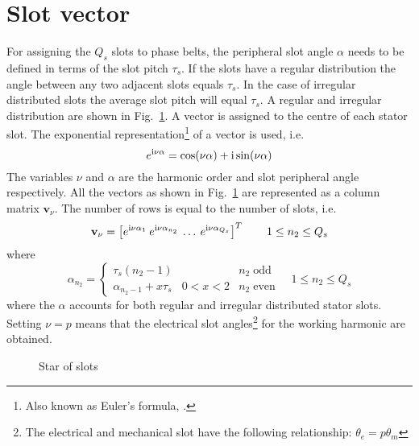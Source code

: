 \section{Slot vector}
For assigning the $Q_s$ slots to phase belts, the peripheral slot angle $\alpha$ needs to be defined in terms of the slot pitch $\tau_s$. If the slots have a regular distribution the angle between any two adjacent slots equals $\tau_s$. In the case of irregular distributed slots the average slot pitch will equal $\tau_s$. A regular and irregular distribution are shown in Fig.~\ref{fig:f_slotstar}. A vector is assigned to the centre of each stator slot. The exponential representation\footnote{Also known as Euler's formula, \cite{REF-01047}.} of a vector is used, i.e.
\begin{equation} 
  e^{{\mathrm{i}}\nu \alpha}=\cos(\nu \alpha)+{\mathrm{i}}\sin(\nu \alpha)
\end{equation}
The variables $\nu$ and $\alpha$ are the harmonic order and slot peripheral angle respectively. All the vectors as shown in Fig.~\ref{fig:f_slotstar} are represented as a column matrix $\mathbf{v}_{\nu}$. The number of rows is equal to the number of slots, i.e.
\begin{equation}
  \label{eqn:slot_vector}
  \mathbf{v}_{\nu}=\left[
                         e^{{\mathrm{i}}\nu\alpha_1} 
                         \: 
                         e^{{\mathrm{i}}\nu\alpha_{n_2}} 
                         \:
                         \ldots 
                         \: e^{{\mathrm{i}}\nu\alpha_{Q_s}}
                    \right]^{T}
   \qquad 1 \leq n_2 \leq Q_s                 
\end{equation}
where
\begin{equation}
  \label{eqn:slot_alpha}
  \alpha_{n_2} = \left\{ \begin{array}{lll}
    \tau_s\left(n_2-1\right) && n_2 \;\text{odd}\\
    \alpha_{n_2-1}+x\tau_s & 0<x<2 & n_2\;\text{even}
  \end{array} \right.
  \quad
  1 \leq n_2 \leq Q_s
\end{equation}
where the $\alpha$ accounts for both regular and irregular distributed stator slots. Setting $\nu=p$ means that the electrical slot angles\footnote{The electrical and mechanical slot have the following relationship: $\theta_e=p \theta_m$} for the working harmonic are obtained. 
\begin{figure}
  \centering
  \fontsize{8}{0}\selectfont
  \subfloat[Regular distribution $x=1$\label{fig:slotstara}]{
  }
  \hfill
  \caption{Star of slots}
  \label{fig:f_slotstar}
\end{figure}

